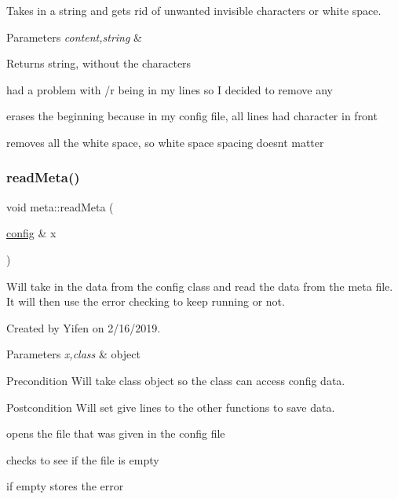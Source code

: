 Takes in a string and gets rid of unwanted invisible characters or white space. 


\begin{DoxyParams}{Parameters}
{\em content,string} & \\
\hline
\end{DoxyParams}
\begin{DoxyReturn}{Returns}
string, without the characters 
\end{DoxyReturn}
had a problem with \textquotesingle{}/r\textquotesingle{} being in my lines so I decided to remove any

erases the beginning because in my config file, all lines had character in front

removes all the white space, so white space spacing doesn\textquotesingle{}t matter \mbox{\label{classmeta_ae9afbaec8f5d1850634923cb991a63ad}} 
\subsubsection{\texorpdfstring{readMeta()}{readMeta()}}
{\footnotesize\ttfamily void meta\+::read\+Meta (\begin{DoxyParamCaption}\item[{\mbox{\hyperlink{classconfig}{config}} \&}]{x }\end{DoxyParamCaption})}



Will take in the data from the config class and read the data from the meta file. It will then use the error checking to keep running or not. 

Created by Yifen on 2/16/2019.
\begin{DoxyParams}{Parameters}
{\em x,class} & object \\
\hline
\end{DoxyParams}
\begin{DoxyPrecond}{Precondition}
Will take class object so the class can access config data. 
\end{DoxyPrecond}
\begin{DoxyPostcond}{Postcondition}
Will set give lines to the other functions to save data. 
\end{DoxyPostcond}
opens the file that was given in the config file

checks to see if the file is empty

if empty stores the error

